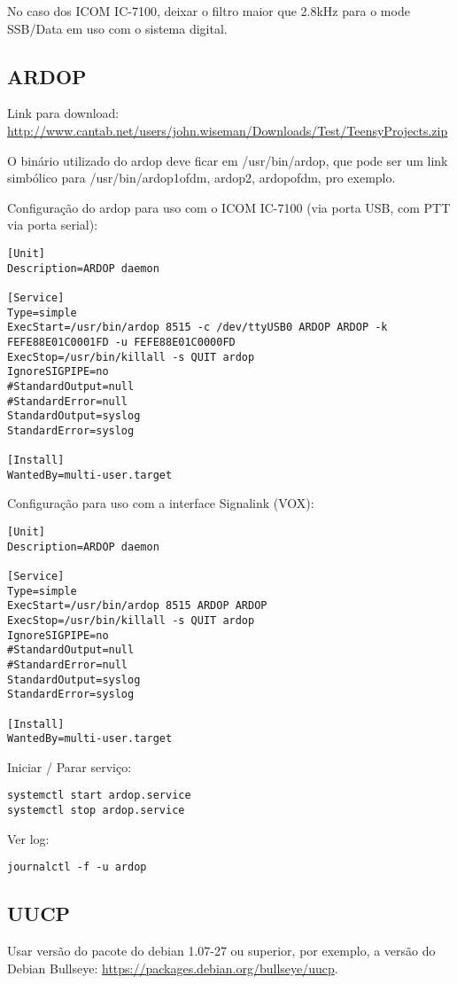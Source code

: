 \documentclass[11pt,a4paper]{article}
\begin{document}
No caso dos ICOM IC-7100, deixar o filtro maior que 2.8kHz para o mode
SSB/Data em uso com o sistema digital.

\subsection{ARDOP}

Link para download: \url{http://www.cantab.net/users/john.wiseman/Downloads/Test/TeensyProjects.zip}

O binário utilizado do ardop deve ficar em /usr/bin/ardop, que pode ser um
link simbólico para /usr/bin/{ardop1ofdm, ardop2, ardopofdm}, pro exemplo.

Configuração do ardop para uso com o ICOM IC-7100 (via porta USB, com PTT
via porta serial):
\begin{verbatim}
[Unit]
Description=ARDOP daemon

[Service]
Type=simple
ExecStart=/usr/bin/ardop 8515 -c /dev/ttyUSB0 ARDOP ARDOP -k FEFE88E01C0001FD -u FEFE88E01C0000FD
ExecStop=/usr/bin/killall -s QUIT ardop
IgnoreSIGPIPE=no
#StandardOutput=null
#StandardError=null
StandardOutput=syslog
StandardError=syslog

[Install]
WantedBy=multi-user.target
\end{verbatim}

Configuração para uso com a interface Signalink (VOX):
\begin{verbatim}
[Unit]
Description=ARDOP daemon

[Service]
Type=simple
ExecStart=/usr/bin/ardop 8515 ARDOP ARDOP
ExecStop=/usr/bin/killall -s QUIT ardop
IgnoreSIGPIPE=no
#StandardOutput=null
#StandardError=null
StandardOutput=syslog
StandardError=syslog

[Install]
WantedBy=multi-user.target
\end{verbatim}


Iniciar / Parar serviço:
\begin{verbatim}
systemctl start ardop.service
systemctl stop ardop.service
\end{verbatim}


Ver log:
\begin{verbatim}
journalctl -f -u ardop
\end{verbatim}

\subsection{UUCP}

Usar versão do pacote do debian 1.07-27 ou superior, por exemplo, a versão
do Debian Bullseye: \url{https://packages.debian.org/bullseye/uucp}.
\end{document}
